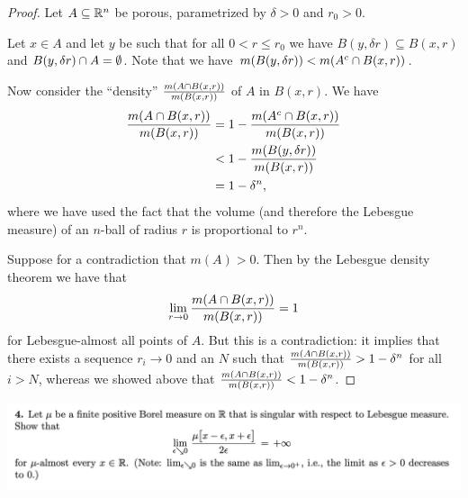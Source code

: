 \begin{proof}
  Let $A \subseteq \mathbb{R}^n$ be porous, parametrized by $\delta > 0$ and $r_0 > 0$.

  Let $x \in A$ and let $y$ be such that for all $0 < r \leq r_0$ we have $B(y, \delta r) \subseteq B(x, r)$
  and $B(y, \delta r) \cap A = \emptyset$. Note that we have $m(B(y, \delta r)) < m(A^c \cap B(x, r))$.

  Now consider the ``density​'' $\frac{m(A \cap B(x, r))}{m(B(x, r))}$ of $A$ in $B(x, r)$. We have
  \begin{align*}
    \frac{m(A \cap B(x, r))}{m(B(x, r))}
    &= 1 - \frac{m(A^c \cap B(x, r))}{m(B(x, r))} \\
    &< 1 - \frac{m(B(y, \delta r))}{m(B(x, r))} \\
    &= 1 - \delta^n,
  \end{align*}
  where we have used the fact that the volume (and therefore the Lebesgue measure) of an $n$-ball of radius $r$
  is proportional to $r^n$.

  Suppose for a contradiction that $m(A) > 0$. Then by the Lebesgue density theorem we have that
  \begin{align*}
    \lim_{r \to 0} \frac{m(A \isect B(x, r))}{m(B(x, r))} = 1
  \end{align*}
  for Lebesgue-almost all points of $A$. But this is a contradiction: it implies that there exists
  a sequence $r_i \to 0$ and an $N$ such
  that $\frac{m(A \cap B(x, r))}{m(B(x, r))} > 1 - \delta^n$ for all $i > N$, whereas we showed
  above that $\frac{m(A \cap B(x, r))}{m(B(x, r))} < 1 - \delta^n$.
\end{proof}



\newpage
\begin{mdframed}
  \includegraphics[width=400pt]{img/analysis--berkeley-202a-final-21a6.png}
\end{mdframed}


